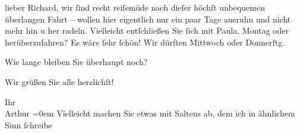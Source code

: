 \pstart{}lieber Richard,\pend\vspace{0.5em}
\pstart
           wir{ }ſind recht reiſemüde nach dieſer höchſt unbequemen überlangen Fahrt – wollen hier
               eigentlich nur ein paar Tage ausruhn und nicht mehr hin u her radeln. Vielleicht
               entſchließen Sie{ }ſich mit Paula,
                  Montag oder \label{K_L02194-1v}\label{K_L02194-1} herüberzufahren? Es wäre{ }ſehr{ }ſchön! Wir dürften Mittwoch oder
                  Donnerſtg\label{K_L02194-2v}\label{K_L02194-2}.\pend
           
\pstart
           Wie lange bleiben Sie überhaupt noch?\pend
           
\pstart
           Wir grüßen Sie alle herzlichſt!\pend
           
\pstart
           Ihr{\\[\baselineskip]}\spacefill\mbox{Arthur}\pend
           \leftskip=0em{}
\pstart
           Vielleicht machen Sie \introOben{}etwas\introOben{} mit Saltens ab, dem ich in ähnlichem Sinn{ }ſchreibe\pend
           \endnumbering{}  \newcommand{\dateiname}{L02194}\newcommand{\titel}{Arthur Schnitzler an Richard Beer-Hofmann, 22. 8. 1914}\newcommand{\editorInnen}{Martin Anton Müller und Gerd-Hermann Susen}
